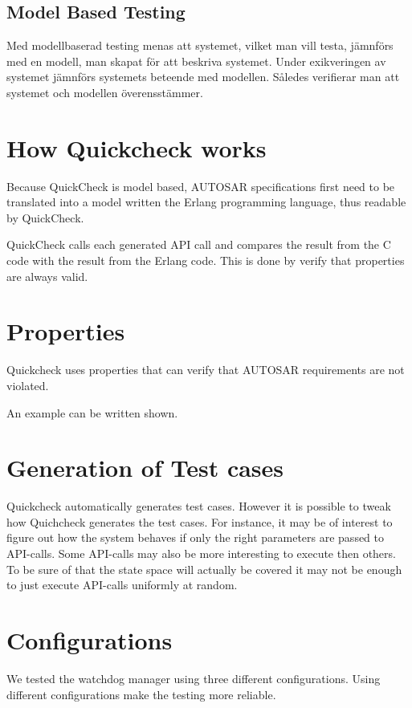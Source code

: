 \documentclass[a4paper]{article}
\begin{document}
\subsection{Model Based Testing}
Med modellbaserad testing menas att systemet, vilket man vill testa, jämnförs med
en modell, man skapat för att beskriva systemet. Under exikveringen av systemet jämnförs
systemets beteende med modellen. Således verifierar man att systemet och modellen överensstämmer.



\section{How Quickcheck works}
Because QuickCheck is model based, AUTOSAR specifications first need
to be translated into a model written the Erlang programming language,
thus readable by QuickCheck.

QuickCheck calls each generated API call and compares the result from
the C code with the result from the Erlang code. This is done by verify that
properties are always valid.

\section{Properties}
Quickcheck uses properties that can verify that AUTOSAR requirements are not
violated.

An example can be written shown.

\section{Generation of Test cases}
Quickcheck automatically generates test cases. However it is possible to tweak
how Quichcheck generates the test cases. For instance, it may be of interest to
figure out how the system behaves if only the right parameters are passed to
API-calls. Some API-calls may also be more interesting to execute then others.
To be sure of that the state space will actually be covered it may not be enough
to just execute API-calls uniformly at random.

\section{Configurations}
We tested the watchdog manager using three different
configurations. Using different configurations make the testing more
reliable.
\end{document}

